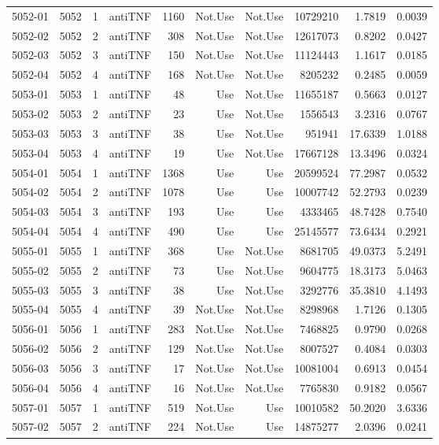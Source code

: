 {\begin{longtable}{ | r | r | r | r | r | r | r | r | r | r | }
5052-01 & 5052 & 1 & antiTNF & 1160 & Not.Use & Not.Use & 10729210 & 1.7819 & 0.0039\\ 
5052-02 & 5052 & 2 & antiTNF & 308 & Not.Use & Not.Use & 12617073 & 0.8202 & 0.0427\\ 
5052-03 & 5052 & 3 & antiTNF & 150 & Not.Use & Not.Use & 11124443 & 1.1617 & 0.0185\\ 
5052-04 & 5052 & 4 & antiTNF & 168 & Not.Use & Not.Use & 8205232 & 0.2485 & 0.0059\\ 
5053-01 & 5053 & 1 & antiTNF & 48 & Use & Not.Use & 11655187 & 0.5663 & 0.0127\\ 
5053-02 & 5053 & 2 & antiTNF & 23 & Use & Not.Use & 1556543 & 3.2316 & 0.0767\\ 
5053-03 & 5053 & 3 & antiTNF & 38 & Use & Not.Use & 951941 & 17.6339 & 1.0188\\ 
5053-04 & 5053 & 4 & antiTNF & 19 & Use & Not.Use & 17667128 & 13.3496 & 0.0324\\ 
5054-01 & 5054 & 1 & antiTNF & 1368 & Use & Use & 20599524 & 77.2987 & 0.0532\\ 
5054-02 & 5054 & 2 & antiTNF & 1078 & Use & Use & 10007742 & 52.2793 & 0.0239\\ 
5054-03 & 5054 & 3 & antiTNF & 193 & Use & Use & 4333465 & 48.7428 & 0.7540\\ 
5054-04 & 5054 & 4 & antiTNF & 490 & Use & Use & 25145577 & 73.6434 & 0.2921\\ 
5055-01 & 5055 & 1 & antiTNF & 368 & Use & Not.Use & 8681705 & 49.0373 & 5.2491\\ 
5055-02 & 5055 & 2 & antiTNF & 73 & Use & Not.Use & 9604775 & 18.3173 & 5.0463\\ 
5055-03 & 5055 & 3 & antiTNF & 38 & Use & Not.Use & 3292776 & 35.3810 & 4.1493\\ 
5055-04 & 5055 & 4 & antiTNF & 39 & Not.Use & Not.Use & 8298968 & 1.7126 & 0.1305\\ 
5056-01 & 5056 & 1 & antiTNF & 283 & Not.Use & Not.Use & 7468825 & 0.9790 & 0.0268\\ 
5056-02 & 5056 & 2 & antiTNF & 129 & Not.Use & Not.Use & 8007527 & 0.4084 & 0.0303\\ 
5056-03 & 5056 & 3 & antiTNF & 17 & Not.Use & Not.Use & 10081004 & 0.6913 & 0.0454\\ 
5056-04 & 5056 & 4 & antiTNF & 16 & Not.Use & Not.Use & 7765830 & 0.9182 & 0.0567\\ 
5057-01 & 5057 & 1 & antiTNF & 519 & Not.Use & Use & 10010582 & 50.2020 & 3.6336\\ 
5057-02 & 5057 & 2 & antiTNF & 224 & Not.Use & Use & 14875277 & 2.0396 & 0.0241\\ 

\end{longtable}}
